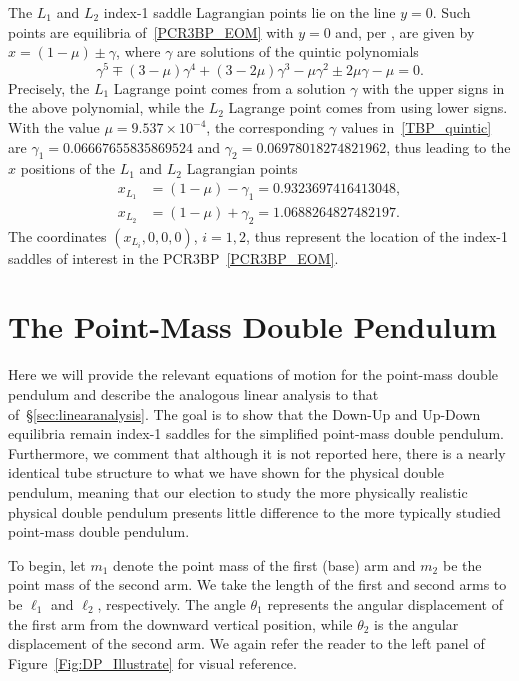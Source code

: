 \documentclass[11pt]{article}
\numberwithin{equation}{section}
\theoremstyle{plain}
\begin{document}
The $L_1$ and $L_2$ index-1 saddle Lagrangian points lie on the line $y=0$. Such points are equilibria of~\eqref{PCR3BP_EOM} with $y = 0$ and, per \cite[Section~2.5]{RossBook}, are given by $x = (1- \mu) \pm \gamma$, where $\gamma$ are solutions of the quintic polynomials
\begin{equation}\label{TBP_quintic}
    \gamma^{5} \mp(3-\mu) \gamma^{4}+(3-2 \mu) \gamma^{3}-\mu \gamma^{2} \pm 2 \mu \gamma-\mu=0.
\end{equation}
Precisely, the $L_1$ Lagrange point comes from a solution $\gamma$ with the upper signs in the above polynomial, while the $L_2$ Lagrange point comes from using lower signs. With the value $\mu=9.537\times 10^{-4}$, the corresponding $\gamma$ values in~\eqref{TBP_quintic} are $\gamma_1=0.06667655835869524$ and $\gamma_2=0.06978018274821962$, thus leading to the $x$ positions of the $L_1$ and $L_2$ Lagrangian points
\begin{equation}\label{TBP_L1L2_Position}
    \begin{split}
        x_{L_1} &=(1-\mu)-\gamma_1=0.9323697416413048, \\
        x_{L_2} &=(1-\mu)+\gamma_2=1.0688264827482197.
    \end{split}
\end{equation}
The coordinates $(x_{L_i},0,0,0)$, $i = 1,2$, thus represent the location of the index-1 saddles of interest in the PCR3BP~\eqref{PCR3BP_EOM}.


\section{The Point-Mass Double Pendulum}

Here we will provide the relevant equations of motion for the point-mass double pendulum and describe the analogous linear analysis to that of~\S\ref{sec:linearanalysis}. The goal is to show that the Down-Up and Up-Down equilibria remain index-1 saddles for the simplified point-mass double pendulum. Furthermore, we comment that although it is not reported here, there is a nearly identical tube structure to what we have shown for the physical double pendulum, meaning that our election to study the more physically realistic physical double pendulum presents little difference to the more typically studied point-mass double pendulum. 

To begin, let $m_1$ denote the point mass of the first (base) arm and $m_2$ be the point mass of the second arm. We take the length of the first and second arms to be $\ell_1$ and $\ell_2$, respectively. The angle $\theta_1$ represents the angular displacement of the first arm from the downward vertical position, while $\theta_2$ is the angular displacement of the second arm. We again refer the reader to the left panel of Figure~\ref{Fig:DP_Illustrate} for visual reference. 
\end{document}
